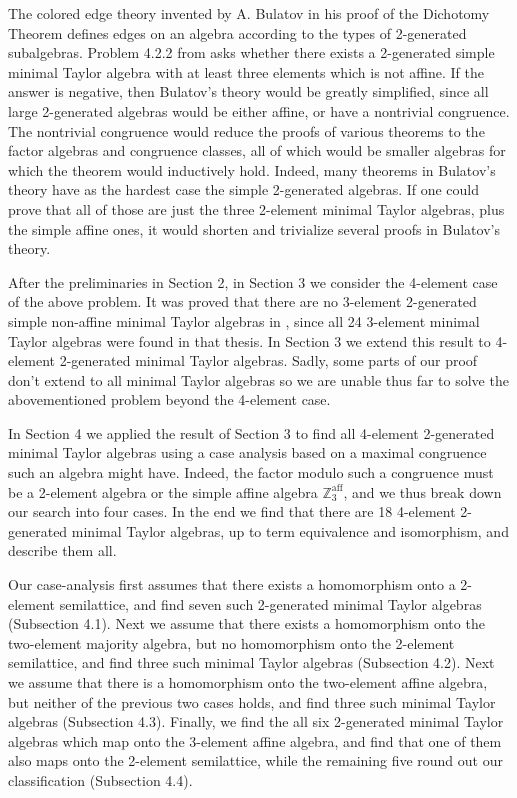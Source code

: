\documentclass[11pt]{amsart}
\theoremstyle{definition}
\theoremstyle{remark}
\theoremstyle{plain}
\begin{document}
The colored edge theory invented by A. Bulatov in his proof of the Dichotomy Theorem defines edges on an algebra according to the types of 2-generated subalgebras. Problem 4.2.2 from \cite{Zebnotes} asks whether there exists a 2-generated simple minimal Taylor algebra with at least three elements which is not affine. If the answer is negative, then Bulatov's theory would be greatly simplified, since all large 2-generated algebras would be either affine, or have a nontrivial congruence. The nontrivial congruence would reduce the proofs of various theorems to the factor algebras and congruence classes, all of which would be smaller algebras for which the theorem would inductively hold. Indeed, many theorems in Bulatov's theory have as the hardest case the simple 2-generated algebras. If one could prove that all of those are just the three 2-element minimal Taylor algebras, plus the simple affine ones, it would shorten and trivialize several proofs in Bulatov's theory. 

After the preliminaries in Section 2, in Section 3 we consider the 4-element case of the above problem. It was proved that there are no 3-element 2-generated simple non-affine minimal Taylor algebras in \cite{jankovec}, since all 24 3-element minimal Taylor algebras were found in that thesis. In Section 3 we extend this result to 4-element 2-generated minimal Taylor algebras. Sadly, some parts of our proof don't extend to all minimal Taylor algebras so we are unable thus far to solve the abovementioned problem beyond the 4-element case.

In Section 4 we applied the result of Section 3 to find all 4-element 2-generated minimal Taylor algebras using a case analysis based on a maximal congruence such an algebra might have. Indeed, the factor modulo such a congruence must be a 2-element algebra or the simple affine algebra $\mathbb{Z}_3^{\mathrm{aff}}$, and we thus break down our search into four cases. In the end we find that there are 18 4-element 2-generated minimal Taylor algebras, up to term equivalence and isomorphism, and describe them all. 

Our case-analysis first assumes that there exists a homomorphism onto a 2-element semilattice, and find seven such 2-generated minimal Taylor algebras (Subsection 4.1). Next we assume that there exists a homomorphism onto the two-element majority algebra, but no homomorphism onto the 2-element semilattice, and find three such minimal Taylor algebras (Subsection 4.2). Next we assume that there is a homomorphism onto the two-element affine algebra, but neither of the previous two cases holds, and find three such minimal Taylor algebras (Subsection 4.3). Finally, we find the all six 2-generated minimal Taylor algebras which map onto the 3-element affine algebra, and find that one of them also maps onto the 2-element semilattice, while the remaining five round out our classification (Subsection 4.4).
\end{document}
